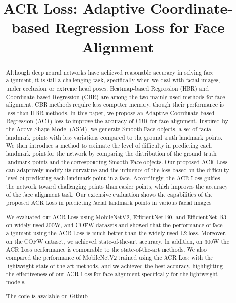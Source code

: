 \documentclass[a4paper,conference]{IEEEtran}
\begin{document}
\title{ACR Loss: Adaptive Coordinate-based Regression Loss for Face Alignment}


\author{
\and
{}
}
\maketitle

\begin{abstract}
Although deep neural networks have achieved reasonable accuracy in solving face alignment, it is still a challenging task, specifically when we deal with facial images, under occlusion, or extreme head poses. Heatmap-based Regression (HBR) and Coordinate-based Regression (CBR) are among the two mainly used methods for face alignment. CBR methods require less computer memory, though their performance is less than HBR methods.
In this paper, we propose an Adaptive Coordinate-based Regression (ACR) loss to improve the accuracy of CBR for face alignment. Inspired by the Active Shape Model (ASM), we generate Smooth-Face objects, a set of facial landmark points with less variations compared to the ground truth landmark points. We then introduce a method to estimate the level of difficulty in predicting each landmark point for the network by comparing the distribution of the ground truth landmark points and the corresponding Smooth-Face objects. Our proposed ACR Loss can adaptively modify its curvature and the influence of the loss based on the difficulty level of predicting each landmark point in a face. Accordingly, the ACR Loss guides the network toward challenging points than easier points, which improves the accuracy of the face alignment task. Our extensive evaluation shows the capabilities of the proposed ACR Loss in predicting facial landmark points in various facial images.

We evaluated our ACR Loss using MobileNetV2, EfficientNet-B0, and EfficientNet-B3 on widely used 300W, and COFW datasets and showed that the performance of face alignment using the ACR Loss is much better than the widely-used L2 loss. Moreover, on the COFW dataset, we achieved state-of-the-art accuracy. In addition, on 300W the ACR Loss performance is comparable to the state-of-the-art methods. We also compared the performance of MobileNetV2 trained using the ACR Loss with the lightweight state-of-the-art methods, and we achieved the best accuracy, highlighting the effectiveness of our ACR Loss for face alignment specifically for the lightweight models. 

The code is available on \href{https://github.com/aliprf/ACR-Loss}{Github}

\end{abstract}
\end{document}
